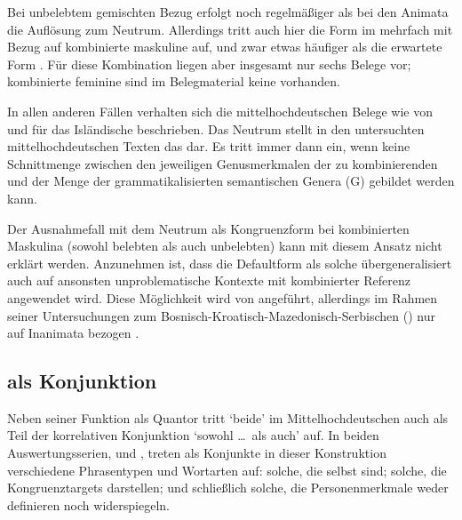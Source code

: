 Bei unbelebtem gemischten Bezug erfolgt noch regelmäßiger als bei den
Animata die Auflösung zum Neutrum. Allerdings
tritt auch hier die Form  im \CAO{} mehrfach mit Bezug auf
kombinierte maskuline  auf, und zwar etwas häufiger als die
erwartete Form . Für diese Kombination liegen aber insgesamt nur
sechs Belege vor; kombinierte feminine  sind im Belegmaterial
keine vorhanden.

In allen anderen Fällen verhalten sich die
mittelhochdeutschen Belege wie von
\citet{wechslerzlatic2003} und \citet{wechsler2009} für das
Isländische beschrieben. Das Neutrum stellt in den untersuchten
mittelhochdeutschen Texten das  dar. Es
tritt immer dann ein, wenn keine Schnittmenge zwischen den jeweiligen
Genusmerkmalen der zu kombinierenden  und der
Menge der grammatikalisierten semantischen Genera (G)
gebildet werden kann.

Der Ausnahmefall mit dem Neutrum als Kongruenzform bei
kombinierten Maskulina (sowohl belebten als auch unbelebten) kann
mit diesem Ansatz nicht erklärt werden. Anzunehmen ist, dass die
Defaultform als solche übergeneralisiert auch
auf ansonsten unproblematische Kontexte mit kombinierter Referenz angewendet
wird. Diese Möglichkeit wird von \citet[302]{corbett1991} angeführt, allerdings
im Rahmen seiner Untersuchungen zum
Bosnisch-\allowbreak{}Kroatisch-\allowbreak{}Mazedonisch-\allowbreak{}Serbischen
() nur auf Inanimata bezogen
\autocites[vgl.~auch][190]{wechslerzlatic2003}[581]{wechsler2009}.


\subsection{ als Konjunktion}

Neben seiner Funktion als Quantor tritt `beide' im
Mittelhochdeutschen auch als Teil der korrelativen
Konjunktion  `sowohl \dots\ als auch' auf. In beiden
Auswertungs\-serien, \CAO{} und \KC{}, treten als Konjunkte in dieser
Konstruktion verschiedene Phrasen\-typen und Wort\-arten auf: solche, die
selbst  sind; solche, die Kongruenztargets darstellen; und
schließlich solche, die Personenmerkmale weder definieren noch widerspiegeln.

